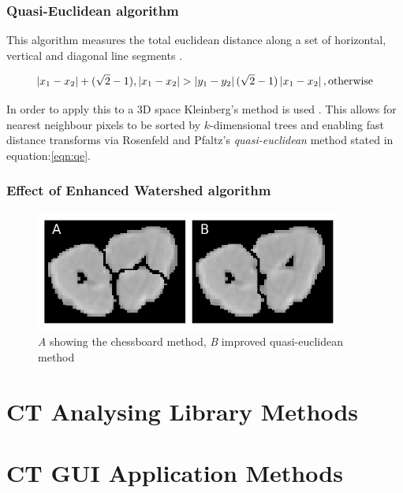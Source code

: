 \documentclass[11pt]{report}
\begin{document}
\subsubsection{Quasi-Euclidean algorithm}
\label{sec-3-2-1-1}

This algorithm measures the total euclidean distance along a set of horizontal, vertical and diagonal
line segments \cite{Pfaltz1966}.

\begin{equation}
\label{eqn:qe}
\left | x_1 - x_2 \right | + (\sqrt{2}-1), \left | x_1 - x_2 \right | >\left | y_1 - y_2 \right | (\sqrt{2}-1) \left | x_1 - x_2 \right | ,\textup{otherwise}
\end{equation}


In order to apply this to a 3D space Kleinberg's method is used  \cite{Kleinberg1997}. This allows for nearest neighbour pixels to be sorted by $k$-dimensional trees
and enabling fast distance transforms via Rosenfeld and Pfaltz's \emph{quasi-euclidean} method stated in equation:\ref{eqn:qe}.
\subsubsection{Effect of Enhanced Watershed algorithm}
\label{sec-3-2-1-2}
\begin{center}
\begin{figure}[htb]
\centering
\includegraphics[width=10cm]{./images/chess_quasi.png}
\caption{\label{fig:qe}\emph{A} showing the chessboard method, \emph{B} improved quasi-euclidean method}
\end{figure}
\end{center}

\section{CT Analysing Library Methods}
\label{sec-3-3}
\section{CT GUI Application Methods}
\label{sec-3-4}
\end{document}

